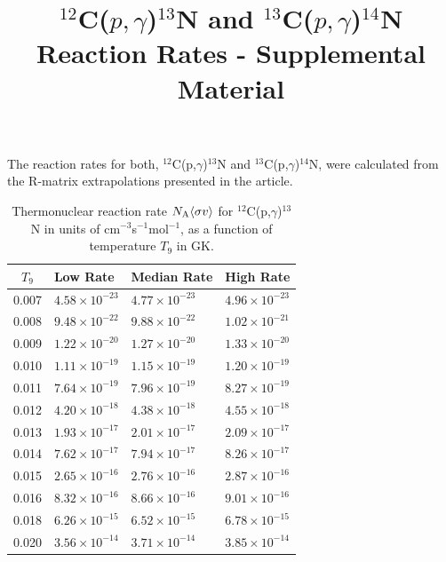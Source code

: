 \documentclass[onecolumn,notitlepage]{revtex4-1}
\begin{document}
\title{\texorpdfstring{$^{12}$C($p,\gamma$)$^{13}$N and $^{13}$C($p,\gamma$)$^{14}$N Reaction Rates - Supplemental Material}
{12C(p,g)13N and 13C(p,g)14N Reaction Rates - Supplemental Material}}

\maketitle

The reaction rates for both, $^{12}$C(p,$\gamma$)$^{13}$N and $^{13}$C(p,$\gamma$)$^{14}$N, were calculated from the R-matrix extrapolations presented in the article.

\begin{table}[ht]
\centering
\begin{minipage}{0.45\linewidth}
\caption{Thermonuclear reaction rate $N_{\rm A}\langle \sigma v\rangle$ for $^{12}$C(p,$\gamma$)$^{13}$N in units of cm$^{-3}$s$^{-1}$mol$^{-1}$, as a function of temperature $T_9$ in GK.}
\label{tab:rr:12c}
\begin{tabular}{| c | l | l | l |}
\hline
$T_9$ & Low Rate & Median Rate & High Rate \\
\hline
\hline
0.007 & $4.58 \times 10^{-23}$ & $4.77 \times 10^{-23}$ & $4.96 \times 10^{-23}$ \\
0.008 & $9.48 \times 10^{-22}$ & $9.88 \times 10^{-22}$ & $1.02 \times 10^{-21}$ \\
0.009 & $1.22 \times 10^{-20}$ & $1.27 \times 10^{-20}$ & $1.33 \times 10^{-20}$ \\
0.010  & $1.11 \times 10^{-19}$ & $1.15 \times 10^{-19}$ & $1.20 \times 10^{-19}$ \\
0.011 & $7.64 \times 10^{-19}$ & $7.96 \times 10^{-19}$ & $8.27 \times 10^{-19}$ \\
0.012 & $4.20 \times 10^{-18}$ & $4.38 \times 10^{-18}$ & $4.55 \times 10^{-18}$ \\
0.013 & $1.93 \times 10^{-17}$ & $2.01 \times 10^{-17}$ & $2.09 \times 10^{-17}$ \\
0.014 & $7.62 \times 10^{-17}$ & $7.94 \times 10^{-17}$ & $8.26 \times 10^{-17}$ \\
0.015 & $2.65 \times 10^{-16}$ & $2.76 \times 10^{-16}$ & $2.87 \times 10^{-16}$ \\
0.016 & $8.32 \times 10^{-16}$ & $8.66 \times 10^{-16}$ & $9.01 \times 10^{-16}$ \\
0.018 & $6.26 \times 10^{-15}$ & $6.52 \times 10^{-15}$ & $6.78 \times 10^{-15}$ \\
0.020  & $3.56 \times 10^{-14}$ & $3.71 \times 10^{-14}$ & $3.85 \times 10^{-14}$ \\

\end{tabular}
\end{minipage}
\end{table}
\end{document}
